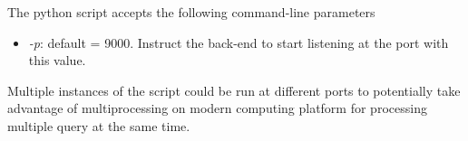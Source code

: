 \documentclass[../manual.tex]{subfiles}
\begin{document}
The python script accepts the following command-line parameters
\begin{itemize}
    \item \emph{-p}: default = 9000. Instruct the back-end to start listening at the port with this value.
\end{itemize}

Multiple instances of the script could be run at different ports to potentially take advantage of multiprocessing on modern computing platform for processing multiple query at the same time.
\end{document}
